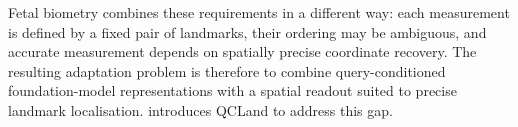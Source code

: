 Fetal biometry combines these requirements in a different way: each
measurement is defined by a fixed pair of landmarks, their ordering
may be ambiguous, and accurate measurement depends on spatially
precise coordinate recovery. The resulting adaptation problem is
therefore to combine query-conditioned foundation-model
representations with a spatial readout suited to precise landmark
localisation.  introduces QCLand to address this
gap.
